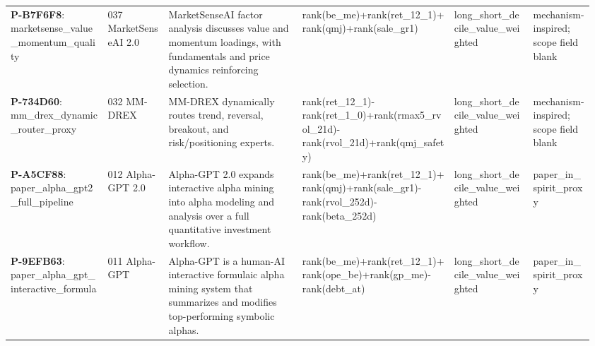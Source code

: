 \begin{longtable}{@{}L{0.16\linewidth}L{0.10\linewidth}L{0.22\linewidth}L{0.25\linewidth}L{0.13\linewidth}L{0.10\linewidth}@{}}
\textbf{P-B7F6F8}: marketsense\_\allowbreak{}value\_\allowbreak{}momentum\_\allowbreak{}quality & 037 MarketSenseAI 2.0 & MarketSenseAI factor analysis discusses value and momentum loadings, with fundamentals and price dynamics reinforcing selection. & rank(\allowbreak{}be\_\allowbreak{}me)\allowbreak{}+\allowbreak{}rank(\allowbreak{}ret\_\allowbreak{}12\_\allowbreak{}1)\allowbreak{}+\allowbreak{}rank(\allowbreak{}qmj)\allowbreak{}+\allowbreak{}rank(\allowbreak{}sale\_\allowbreak{}gr1)\allowbreak{} & long\_\allowbreak{}short\_\allowbreak{}decile\_\allowbreak{}value\_\allowbreak{}weighted & mechanism-\allowbreak{}inspired;\allowbreak{} scope field blank \\
\textbf{P-734D60}: mm\_\allowbreak{}drex\_\allowbreak{}dynamic\_\allowbreak{}router\_\allowbreak{}proxy & 032 MM-DREX & MM-DREX dynamically routes trend, reversal, breakout, and risk/positioning experts. & rank(\allowbreak{}ret\_\allowbreak{}12\_\allowbreak{}1)\allowbreak{}-\allowbreak{}rank(\allowbreak{}ret\_\allowbreak{}1\_\allowbreak{}0)\allowbreak{}+\allowbreak{}rank(\allowbreak{}rmax5\_\allowbreak{}rvol\_\allowbreak{}21d)\allowbreak{}-\allowbreak{}rank(\allowbreak{}rvol\_\allowbreak{}21d)\allowbreak{}+\allowbreak{}rank(\allowbreak{}qmj\_\allowbreak{}safety)\allowbreak{} & long\_\allowbreak{}short\_\allowbreak{}decile\_\allowbreak{}value\_\allowbreak{}weighted & mechanism-\allowbreak{}inspired;\allowbreak{} scope field blank \\
\textbf{P-A5CF88}: paper\_\allowbreak{}alpha\_\allowbreak{}gpt2\_\allowbreak{}full\_\allowbreak{}pipeline & 012 Alpha-GPT 2.0 & Alpha-GPT 2.0 expands interactive alpha mining into alpha modeling and analysis over a full quantitative investment workflow. & rank(\allowbreak{}be\_\allowbreak{}me)\allowbreak{}+\allowbreak{}rank(\allowbreak{}ret\_\allowbreak{}12\_\allowbreak{}1)\allowbreak{}+\allowbreak{}rank(\allowbreak{}qmj)\allowbreak{}+\allowbreak{}rank(\allowbreak{}sale\_\allowbreak{}gr1)\allowbreak{}-\allowbreak{}rank(\allowbreak{}rvol\_\allowbreak{}252d)\allowbreak{}-\allowbreak{}rank(\allowbreak{}beta\_\allowbreak{}252d)\allowbreak{} & long\_\allowbreak{}short\_\allowbreak{}decile\_\allowbreak{}value\_\allowbreak{}weighted & paper\_\allowbreak{}in\_\allowbreak{}spirit\_\allowbreak{}proxy \\
\textbf{P-9EFB63}: paper\_\allowbreak{}alpha\_\allowbreak{}gpt\_\allowbreak{}interactive\_\allowbreak{}formula & 011 Alpha-GPT & Alpha-GPT is a human-AI interactive formulaic alpha mining system that summarizes and modifies top-performing symbolic alphas. & rank(\allowbreak{}be\_\allowbreak{}me)\allowbreak{}+\allowbreak{}rank(\allowbreak{}ret\_\allowbreak{}12\_\allowbreak{}1)\allowbreak{}+\allowbreak{}rank(\allowbreak{}ope\_\allowbreak{}be)\allowbreak{}+\allowbreak{}rank(\allowbreak{}gp\_\allowbreak{}me)\allowbreak{}-\allowbreak{}rank(\allowbreak{}debt\_\allowbreak{}at)\allowbreak{} & long\_\allowbreak{}short\_\allowbreak{}decile\_\allowbreak{}value\_\allowbreak{}weighted & paper\_\allowbreak{}in\_\allowbreak{}spirit\_\allowbreak{}proxy \\

\end{longtable}
